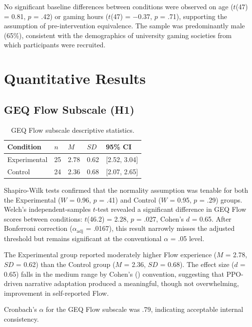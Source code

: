 No significant baseline differences between conditions were observed on age ($t$(47) = 0.81, $p$ = .42) or gaming hours ($t$(47) = $-0.37$, $p$ = .71), supporting the assumption of pre-intervention equivalence. The sample was predominantly male (65\%), consistent with the demographics of university gaming societies from which participants were recruited.

\section{Quantitative Results}

\subsection{GEQ Flow Subscale (H1)}

\begin{table}[H]
\centering
\caption{GEQ Flow subscale descriptive statistics.}
\label{tab:geq_flow}
\small
\begin{tabular}{@{}lllll@{}}
\toprule
\textbf{Condition} & $n$ & $M$ & $SD$ & \textbf{95\% CI} \\
\midrule
Experimental & 25 & 2.78 & 0.62 & [2.52, 3.04] \\
Control & 24 & 2.36 & 0.68 & [2.07, 2.65] \\
\bottomrule
\end{tabular}
\end{table}

Shapiro-Wilk tests confirmed that the normality assumption was tenable for both the Experimental ($W$ = 0.96, $p$ = .41) and Control ($W$ = 0.95, $p$ = .29) groups. Welch's independent-samples $t$-test revealed a significant difference in GEQ Flow scores between conditions: $t$(46.2) = 2.28, $p$ = .027, Cohen's $d$ = 0.65. After Bonferroni correction ($\alpha_{\text{adj}}$ = .0167), this result narrowly misses the adjusted threshold but remains significant at the conventional $\alpha$ = .05 level.

The Experimental group reported moderately higher Flow experience ($M$ = 2.78, $SD$ = 0.62) than the Control group ($M$ = 2.36, $SD$ = 0.68). The effect size ($d$ = 0.65) falls in the medium range by Cohen's (\citeyear{cohen1988statistical}) convention, suggesting that PPO-driven narrative adaptation produced a meaningful, though not overwhelming, improvement in self-reported Flow.

Cronbach's $\alpha$ for the GEQ Flow subscale was .79, indicating acceptable internal consistency.

